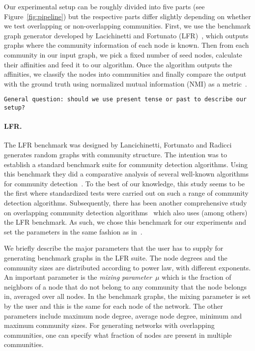 Our experimental setup can be roughly divided into five parts (see Figure~\ref{fig:pipeline}) but the 
respective parts differ slightly depending on whether we test overlapping or non-overlapping 
communities. First, we use the benchmark graph generator developed by Lacichinetti and Fortunato 
(LFR)~\cite{LFR08, LF09}, which outputs graphs where the community information of each node 
is known. Then from each community in our input graph, we pick a fixed number of seed nodes, 
calculate their affinities and feed it to our algorithm. Once the algorithm outputs the 
affinities, we classify the nodes into communities and finally compare the output 
with the ground truth using normalized mutual information (NMI) as a metric~\cite{DDDA05}.

\texttt{General question: should we use present tense or past to describe our setup?}

\paragraph{LFR.}
The LFR benchmark was designed by Lancichinetti, Fortunato and Radicci~\cite{LFR08}
generates random graphs with community structure. The intention was to establish a 
standard benchmark suite for community detection algorithms. Using this benchmark they 
did a comparative analysis of several well-known algorithms
for community detection~\cite{LF09}. To the best of our knowledge, this study seems to be the 
first where standardized tests were carried out on such a range of community detection algorithms. 
Subsequently, there has been another comprehensive study on overlapping community detection 
algorithms~\cite{XKS13} which also uses (among others) the LFR benchmark. As such, we chose this 
benchmark for our experiments and set the parameters in the same fashion as in~\cite{LF09}. 

We briefly describe the major parameters that the user has to supply 
for generating benchmark graphs in the LFR suite. The node degrees and the 
community sizes are distributed according to power law, with different exponents. 
An important parameter is the \emph{mixing parameter~$\mu$} which is the fraction of neighbors 
of a node that do not belong to any community that the node belongs in, averaged over all nodes.
In the benchmark graphs, the mixing parameter is set by the user and this is the same for each 
node of the network. The other parameters include maximum node degree, average node degree, 
minimum and maximum community sizes. For generating networks with overlapping communities, 
one can specify what fraction of nodes are present in multiple communities.


